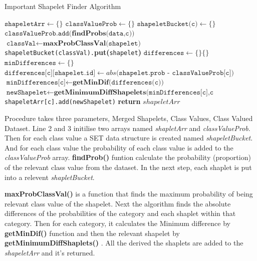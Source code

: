 \documentclass[letterpaper, 10 pt, conference]{IEEEtran}  %
\begin{document}
\begin{algorithm}[H]
  \caption{Important Shapelet Finder Algorithm}\label{shapeletFInder}
  \begin{algorithmic}[1]
     \State $\texttt{shapeletArr} \gets \{\}$
     \State $\texttt{classValueProb} \gets \{\}$
     \State $\texttt{shapeletBucket(c)} \gets \{\}$
     \State $\texttt{classValueProb.add(}  \textbf{findProbs(}\texttt{data,c))}$
     \EndFor
     \State $\texttt{classVal} \gets \textbf{maxProbClassVal(} \texttt{shapelet} \textbf{)}$
     \State \texttt{shapeletBucket(classVal).}\textbf{put(}\texttt{shapelet}\textbf{)}
     \EndFor
     \State $\texttt{differences} \gets \{\} \{\}$
     \State $\texttt{minDifferences} \gets \{\}$
     	\State $\texttt{differences[c][shapelet.id]} \gets \textbf{}{abs(} \texttt{shapelet.prob - classValueProb[c])}$
     \EndFor
     \State $\texttt{minDifferences[c]} \gets \textbf{getMinDif(}\texttt{differences(c))}$
     $\texttt{newShapelet} \gets \textbf{getMinimumDiffShapelets(}
     \texttt{minDifferences[c],c}\textbf{}$
     \State \texttt{shapeletArr[c].add(newShapelet)}
     \EndFor
      \State \textbf{return} $shapeletArr$
    \EndProcedure
  \end{algorithmic}
\end{algorithm}

Procedure takes three parameters, Merged Shapelets, Class Values, Class Valued Dataset. Line 2 and 3 initilise two arrays named \textit{shapletArr}  and \textit{classValueProb}. Then for each class value a SET data structure is created named \textit{shapeletBucket}. And for each class value the probability of each class value is added to the \textit{classValueProb} array. \textbf{findProb()} funtion calculate the probability (proportion) of the relevant class value from the dataset. In the next step, each shaplet is put into a relevent \textit{shapletBucket}.

 \textbf{maxProbClassVal()} is a function that finds the maximum probability of being relevant class value of the shapelet.  Next the algorithm finds the absolute differences of the probabilities of the category and each shaplet within that category. Then for each category, it calculates the Minimum difference by \textbf{getMinDif()} function and then the relevant shapelet by \textbf{getMinimumDiffShaplets()} . All the derived the shaplets are added to the \textit{shapeletArr} and it’s returned. 
\end{document}
